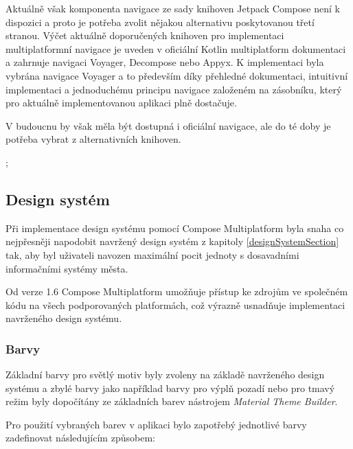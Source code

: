 Aktuálně však komponenta navigace ze sady knihoven Jetpack Compose není k dispozici a proto je potřeba zvolit nějakou alternativu poskytovanou
třetí stranou. \cite{composeNav} Výčet aktuálně doporučených knihoven pro implementaci multiplatformní navigace je uveden v oficiální Kotlin 
multiplatform dokumentaci a zahrnuje navigaci Voyager, Decompose nebo Appyx. K implementaci byla vybrána navigace Voyager a 
to především díky přehledné dokumentaci, intuitivní implementaci a jednoduchému principu navigace založeném na zásobníku, který pro aktuálně
implementovanou aplikaci plně dostačuje.

V budoucnu by však měla být dostupná i oficiální navigace, ale do té doby je potřeba vybrat z alternativních knihoven.


;
\subsection{Design systém}

Při implementace design systému pomocí Compose Multiplatform byla snaha co nejpřesněji napodobit navržený design systém z kapitoly \ref{designSystemSection}
tak, aby byl uživateli navozen maximální pocit jednoty s dosavadními informačními systémy města.

Od verze 1.6 Compose Multiplatform umožňuje přístup ke zdrojům ve společném kódu na všech podporovaných platformách, což výrazně usnadňuje 
implementaci navrženého design systému. 



\subsubsection*{Barvy} \label{colorSection}
Základní barvy pro světlý motiv byly zvoleny na základě navrženého design systému
a zbylé barvy jako například barvy pro výplň pozadí nebo pro tmavý režim byly dopočítány ze základních barev nástrojem \textit{Material Theme Builder}.

Pro použití vybraných barev v aplikaci bylo zapotřebý jednotlivé barvy zadefinovat následujícím způsobem:


